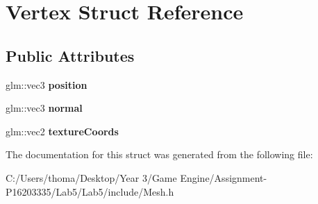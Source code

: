 \hypertarget{struct_vertex}{}\section{Vertex Struct Reference}
\label{struct_vertex}
\subsection*{Public Attributes}
\begin{DoxyCompactItemize}
\item 
\mbox{\label{struct_vertex_a030819fdc241743bbd3e180a6b132ed3}} 
glm\+::vec3 {\bfseries position}
\item 
\mbox{\label{struct_vertex_a3aa35fe84025ecf1acccb5f65f5577fd}} 
glm\+::vec3 {\bfseries normal}
\item 
\mbox{\label{struct_vertex_a03ba1fdd25400383cd40bd2153d08ef1}} 
glm\+::vec2 {\bfseries texture\+Coords}
\end{DoxyCompactItemize}


The documentation for this struct was generated from the following file\+:\begin{DoxyCompactItemize}
\item 
C\+:/\+Users/thoma/\+Desktop/\+Year 3/\+Game Engine/\+Assignment-\/\+P16203335/\+Lab5/\+Lab5/include/Mesh.\+h\end{DoxyCompactItemize}
